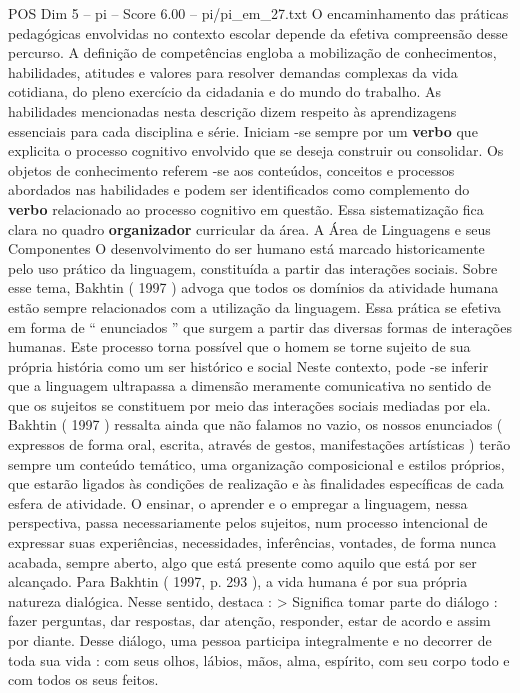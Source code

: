 \begin{textsample}{POS Dim 5 – pi – Score 6.00 – pi/pi\_em\_27.txt}
O encaminhamento das práticas pedagógicas envolvidas no contexto escolar depende da efetiva compreensão desse percurso.
A definição de competências engloba a mobilização de conhecimentos, habilidades, atitudes e valores para resolver demandas complexas da vida cotidiana, do pleno exercício da cidadania e do mundo do trabalho.
As habilidades mencionadas nesta descrição dizem respeito às aprendizagens essenciais para cada disciplina e série.
Iniciam -se sempre por um \textbf{verbo} que explicita o processo cognitivo envolvido que se deseja construir ou consolidar.
Os objetos de conhecimento referem -se aos conteúdos, conceitos e processos abordados nas habilidades e podem ser identificados como complemento do \textbf{verbo} relacionado ao processo cognitivo em questão.
Essa sistematização fica clara no quadro \textbf{organizador} curricular da área.
A Área de Linguagens e seus Componentes O desenvolvimento do ser humano está marcado historicamente pelo uso prático da linguagem, constituída a partir das interações sociais.
Sobre esse tema, Bakhtin ( 1997 ) advoga que todos os domínios da atividade humana estão sempre relacionados com a utilização da linguagem.
Essa prática se efetiva em forma de “ enunciados ” que surgem a partir das diversas formas de interações humanas.
Este processo torna possível que o homem se torne sujeito de sua própria história como um ser histórico e social Neste contexto, pode -se inferir que a linguagem ultrapassa a dimensão meramente comunicativa no sentido de que os sujeitos se constituem por meio das interações sociais mediadas por ela.
Bakhtin ( 1997 ) ressalta ainda que não falamos no vazio, os nossos enunciados ( expressos de forma oral, escrita, através de gestos, manifestações artísticas ) terão sempre um conteúdo temático, uma organização composicional e estilos próprios, que estarão ligados às condições de realização e às finalidades específicas de cada esfera de atividade.
O ensinar, o aprender e o empregar a linguagem, nessa perspectiva, passa necessariamente pelos sujeitos, num processo intencional de expressar suas experiências, necessidades, inferências, vontades, de forma nunca acabada, sempre aberto, algo que está presente como aquilo que está por ser alcançado.
Para Bakhtin ( 1997, p. 293 ), a vida humana é por sua própria natureza dialógica.
Nesse sentido, destaca : > Significa tomar parte do diálogo : fazer perguntas, dar respostas, dar atenção, responder, estar de acordo e assim por diante.
Desse diálogo, uma pessoa participa integralmente e no decorrer de toda sua vida : com seus olhos, lábios, mãos, alma, espírito, com seu corpo todo e com todos os seus feitos.

\end{textsample}
